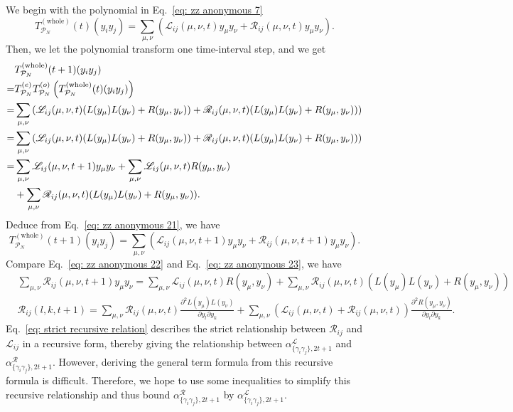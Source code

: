 \documentclass{article}
\newcommand{\Twhole}{T^{(\text{whole})}}
\newcommand{\alpl}{\alpha_{\{\gamma_i\gamma_j\}, 2t+1}^{\mathscr{L}}}
\newcommand{\alpr}{\alpha_{\{\gamma_i\gamma_j\}, 2t+1}^{\mathscr{R}}}
\begin{document}
We begin with the polynomial in Eq.~\eqref{eq: zz anonymous 7}
\begin{equation}
\label{eq: zz anonymous 21}
    \Twhole_{\mathcal{P}_N} (t) (y_i y_j) 
    =\sum_{\mu,\nu} \left(\mathscr{L}_{ij} (\mu, \nu, t) y_\mu y_\nu + \mathscr{R}_{ij} (\mu, \nu, t) y_\mu y_\nu\right).
\end{equation}
Then, we let the polynomial transform one time-interval step, and we get
\begin{align}
    &\Twhole_{\mathcal{P}_N} (t+1) (y_i y_j) \\
    =& \teto\left(\Twhole_{\mathcal{P}_N} (t) (y_i y_j)\right) \\
    =& \sum_{\mu,\nu} \left(\mathscr{L}_{ij} (\mu, \nu, t) (L(y_\mu) L(y_\nu) + R(y_\mu, y_\nu)) + \mathscr{R}_{ij} (\mu, \nu, t) (L(y_\mu) L(y_\nu) + R(y_\mu, y_\nu))\right)\\
    =& \sum_{\mu,\nu} \left(\mathscr{L}_{ij} (\mu, \nu, t) (L(y_\mu) L(y_\nu) + R(y_\mu, y_\nu)) + \mathscr{R}_{ij} (\mu, \nu, t) (L(y_\mu) L(y_\nu) + R(y_\mu, y_\nu))\right)\\
    =& \sum_{\mu,\nu} \mathscr{L}_{ij} (\mu, \nu, t+1) y_\mu y_\nu +  \sum_{\mu,\nu}\mathscr{L}_{ij} (\mu, \nu, t) R(y_\mu, y_\nu) \nonumber\\
    & + \sum_{\mu,\nu}\mathscr{R}_{ij} (\mu, \nu, t) (L(y_\mu) L(y_\nu) + R(y_\mu, y_\nu)).
    \label{eq: zz anonymous 22}
\end{align}
Deduce from Eq.~\eqref{eq: zz anonymous 21}, we have
\begin{equation}
    \label{eq: zz anonymous 23}
    \Twhole_{\mathcal{P}_N} (t+1) (y_i y_j) 
    =\sum_{\mu,\nu} \left(\mathscr{L}_{ij} (\mu, \nu, t+1) y_\mu y_\nu + \mathscr{R}_{ij} (\mu, \nu, t+1) y_\mu y_\nu\right). 
\end{equation}
Compare Eq.~\eqref{eq: zz anonymous 22} and Eq.~\eqref{eq: zz anonymous 23}, we have 
\begin{align}
    &\sum_{\mu,\nu} \mathscr{R}_{ij} (\mu, \nu, t+1) y_\mu y_\nu = \sum_{\mu,\nu}\mathscr{L}_{ij} (\mu, \nu, t) R(y_\mu, y_\nu) + \sum_{\mu,\nu}\mathscr{R}_{ij} (\mu, \nu, t) (L(y_\mu) L(y_\nu) + R(y_\mu, y_\nu)) \\
    &\mathscr{R}_{ij} (l, k, t+1) =  \sum_{\mu,\nu}\mathscr{R}_{ij} (\mu, \nu, t) \frac{\partial^2L(y_\mu) L(y_\nu)}{\partial y_l \partial y_k} + \sum_{\mu,\nu}\left( \mathscr{L}_{ij} (\mu, \nu, t) + \mathscr{R}_{ij} (\mu, \nu, t) \right)\frac{\partial^2 R(y_\mu, y_\nu)}{\partial y_l \partial y_k}.
    \label{eq: strict recursive relation}
\end{align}
Eq.~\eqref{eq: strict recursive relation} describes the strict relationship between $\mathscr{R}_{ij}$ and $\mathscr{L}_{ij}$ in a recursive form, thereby giving the relationship between $\alpl$ and $\alpr$. However, deriving the general term formula from this recursive formula is difficult. Therefore, we hope to use some inequalities to simplify this recursive relationship and thus bound $\alpr$ by $\alpl$.
\end{document}
